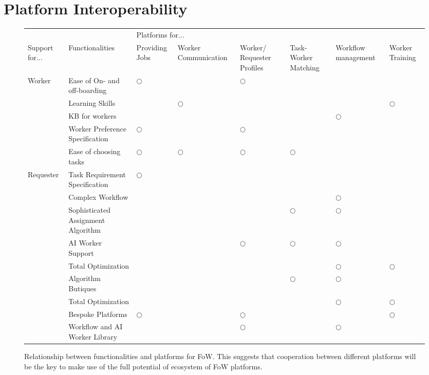 \section{Platform Interoperability}
\label{sec:platformInteroperability}


\begin{figure*}
\small
\begin{tabular}{|p{15mm}|p{3cm}|p{15mm}|p{15mm}|p{15mm}|p{15mm}|p{15mm}|p{15mm}|}
\hline
&&\multicolumn{6}{|l|}{Platforms for$\ldots$}\\
\cline{3-8}
Support for$\ldots$&Functionalities&Providing Jobs&Worker Communication&Worker/ Requester Profiles& Task-Worker Matching&Workflow
management&Worker Training\\
\hline
Worker&Ease of On- and off-boarding&$\bigcirc$&&$\bigcirc$&&&\\
\cline{2-8}
&Learning Skills&&$\bigcirc$&&&&$\bigcirc$\\
\cline{2-8}
&KB for workers&&&&&$\bigcirc$&\\
\cline{2-8}
&Worker Preference Specification&$\bigcirc$&&$\bigcirc$&&&\\
\cline{2-8}
&Ease of choosing tasks&$\bigcirc$&$\bigcirc$&$\bigcirc$&$\bigcirc$&&\\
\hline
Requester&Task Requirement Specification&$\bigcirc$&&&&&\\
\cline{2-8}
&Complex Workflow&&&&&$\bigcirc$&\\
\cline{2-8}
&Sophisticated Assignment Algorithm&&&&$\bigcirc$&$\bigcirc$&\\
\cline{2-8}
&AI Worker Support&&&$\bigcirc$&$\bigcirc$&$\bigcirc$&\\
\cline{2-8}
&Total Optimization&&&&&$\bigcirc$&$\bigcirc$\\
\cline{2-8}
&Algorithm Butiques&&&&$\bigcirc$&$\bigcirc$&\\
\cline{2-8}
&Total Optimization&&&&&$\bigcirc$&$\bigcirc$\\
\cline{2-8}
&Bespoke Platforms&$\bigcirc$&&$\bigcirc$&&&$\bigcirc$\\
\cline{2-8}
&Workflow and AI Worker Library&&&$\bigcirc$&&$\bigcirc$&\\
\hline
\end{tabular}
\caption{Relationship between functionalities and platforms for FoW. 
This suggests that cooperation between different platforms will be the key to make use of the full potential of ecosystem of FoW platforms. 
}
\label{fig:functionsandplatforms}
\end{figure*}

